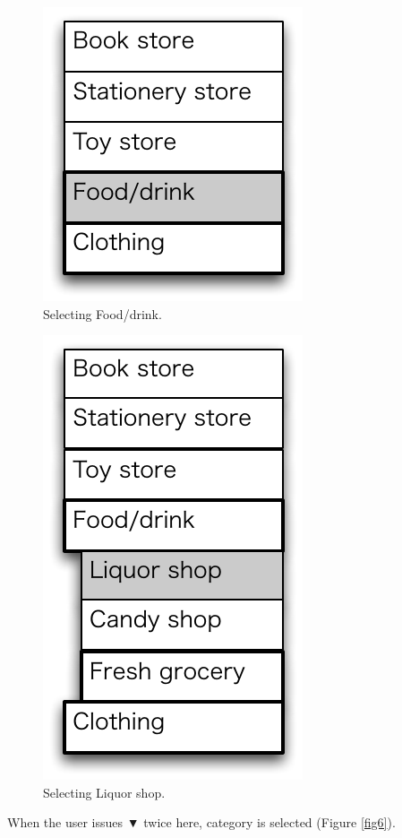 \documentclass{article}
\def\down{▼}
\begin{document}
\begin{figure}[H]
\centerline{\includegraphics[width=\menuwidth,bb=0 0 139 157]{figures/fig4.pdf}}
\caption{Selecting Food/drink.}
\label{fig4}
\end{figure}

\begin{figure}[H]
\centerline{\includegraphics[width=\menuwidth,bb=0 0 139 238]{figures/fig5.pdf}}
\caption{Selecting Liquor shop.}
\label{fig5}
\end{figure}

When the user issues {\down} twice here,
 category is selected (Figure \ref{fig6}).
\end{document}
